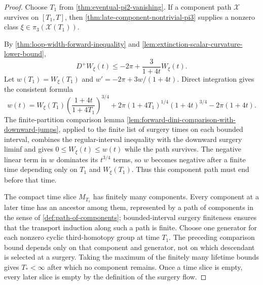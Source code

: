 \begin{proof}
Choose $T_1$ from \ref{thm:eventual-pi2-vanishing}.  If a component path
$\mathcal X$ survives on $[T_1,T]$, then
\ref{thm:late-component-nontrivial-pi3} supplies a nonzero class
$\xi\in\pi_3(\mathcal X(T_1))$.

By \ref{thm:loop-width-forward-inequality} and
\ref{lem:extinction-scalar-curvature-lower-bound},
\[
 D^+W_\xi(t)\le-2\pi+\frac3{1+4t}W_\xi(t).
\]
Let $w(T_1)=W_\xi(T_1)$ and
$w'=-2\pi+3w/(1+4t)$.  Direct integration gives the consistent formula
\[
 w(t)=W_\xi(T_1)
       \left(\frac{1+4t}{1+4T_1}\right)^{3/4}
 +2\pi(1+4T_1)^{1/4}(1+4t)^{3/4}-2\pi(1+4t).
\]
The finite-partition comparison lemma
\ref{lem:forward-dini-comparison-with-downward-jumps}, applied to the finite
list of surgery times on each bounded interval, combines the regular-interval
inequality with the downward surgery liminf and gives
$0\le W_\xi(t)\le w(t)$ while the path survives.  The negative linear
term in $w$ dominates its $t^{3/4}$ terms, so $w$ becomes negative after a
finite time depending only on $T_1$ and $W_\xi(T_1)$.  Thus this component
path must end before that time.

The compact time slice $M_{T_1}$ has finitely many components.  Every
component at a later time has an ancestor among them, represented by a path of
components in the sense of \ref{def:path-of-components}; bounded-interval
surgery finiteness ensures that the transport induction along such a path is
finite.  Choose one generator for each nonzero cyclic third-homotopy group at
time $T_1$.  The preceding comparison bound depends only on that component and
generator, not on which descendant is selected at a surgery.  Taking the
maximum of the finitely many lifetime bounds gives $T_*<\infty$ after which
no component remains.  Once a time slice is empty, every later slice is empty
by the definition of the surgery flow.
\end{proof}
